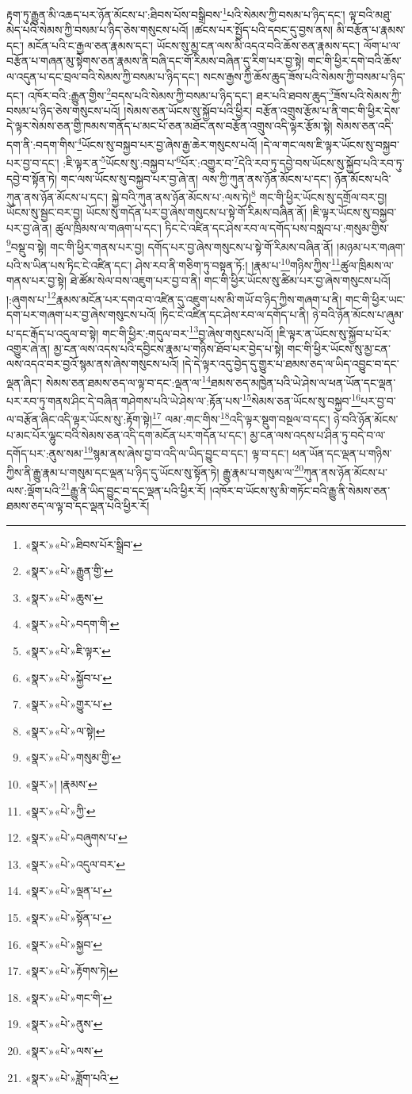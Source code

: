 རྟག་ཏུ་རྒྱུན་མི་འཆད་པར་ཉོན་མོངས་པ་:ཐིབས་པོས་བསྒྲིབས་\footnote{«སྣར་»«པེ་»ཐིབས་པོར་སྒྲིབ་}པའི་སེམས་ཀྱི་བསམ་པ་ཉིད་དང་། ལྟ་བའི་མཐུ་མེད་པའི་སེམས་ཀྱི་བསམ་པ་ཉིད་ཅེས་གསུངས་པའོ། །ཚངས་པར་སྤྱོད་པའི་དབང་དུ་བྱས་ནས། མི་བརྩོན་པ་རྣམས་དང་། མངོན་པའི་ང་རྒྱལ་ཅན་རྣམས་དང་། ཡོངས་སུ་མྱ་ངན་ལས་མི་འདའ་བའི་ཆོས་ཅན་རྣམས་དང་། ལོག་པ་ལ་བརྩོན་པ་གཞན་མུ་སྟེགས་ཅན་རྣམས་ནི་བཞི་དང་གོ་རིམས་བཞིན་དུ་རིག་པར་བྱ་སྟེ། གང་གི་ཕྱིར་དགེ་བའི་ཆོས་ལ་འདུན་པ་དང་བྲལ་བའི་སེམས་ཀྱི་བསམ་པ་ཉིད་དང་། སངས་རྒྱས་ཀྱི་ཆོས་ཆུད་ཟོས་པའི་སེམས་ཀྱི་བསམ་པ་ཉིད་དང་། འཁོར་བའི་:རྒྱུན་གྱིས་\footnote{«སྣར་»«པེ་»རྒྱུན་གྱི་}བདས་པའི་སེམས་ཀྱི་བསམ་པ་ཉིད་དང་། ཐར་པའི་ཐབས་ཆུད་\footnote{«སྣར་»«པེ་»ཆུས་}ཟོས་པའི་སེམས་ཀྱི་བསམ་པ་ཉིད་ཅེས་གསུངས་པའོ། །སེམས་ཅན་ཡོངས་སུ་སྐྱོབ་པའི་ཕྱིར། བརྩོན་འགྲུས་རྩོམ་པ་ནི་གང་གི་ཕྱིར་དེས་དེ་ལྟར་སེམས་ཅན་གྱི་ཁམས་གནོད་པ་མང་པོ་ཅན་མཐོང་ནས་བརྩོན་འགྲུས་འདི་ལྟར་རྩོམ་སྟེ། སེམས་ཅན་འདི་དག་ནི་:བདག་གིས་\footnote{«སྣར་»«པེ་»བདག་གི་}ཡོངས་སུ་བསྐྱབ་པར་བྱ་ཞེས་རྒྱ་ཆེར་གསུངས་པའོ། །དེ་ལ་གང་ལས་ཇི་ལྟར་ཡོངས་སུ་བསྐྱབ་པར་བྱ་བ་དང་། :ཇི་ལྟར་ན་\footnote{«སྣར་»«པེ་»ཇི་ལྟར་}ཡོངས་སུ་:བསྐྱབ་པ་\footnote{«སྣར་»«པེ་»སྐྱོབ་པ་}པོར་:འགྱུར་བ་\footnote{«སྣར་»«པེ་»གྱུར་པ་}དེའི་རབ་ཏུ་དབྱེ་བས་ཡོངས་སུ་སྐྱོབ་པའི་རབ་ཏུ་དབྱེ་བ་སྟོན་ཏེ། གང་ལས་ཡོངས་སུ་བསྐྱབ་པར་བྱ་ཞེ་ན། ལས་ཀྱི་ཀུན་ནས་ཉོན་མོངས་པ་དང་། ཉོན་མོངས་པའི་ཀུན་ནས་ཉོན་མོངས་པ་དང་། སྐྱེ་བའི་ཀུན་ནས་ཉོན་མོངས་པ་:ལས་ཏེ།\footnote{«སྣར་»«པེ་»ལ་སྟེ།} གང་གི་ཕྱིར་ཡོངས་སུ་དགྲོལ་བར་བྱ། ཡོངས་སུ་སྦྱང་བར་བྱ། ཡོངས་སུ་གདོན་པར་བྱ་ཞེས་གསུངས་པ་སྟེ་གོ་རིམས་བཞིན་ནོ། །ཇི་ལྟར་ཡོངས་སུ་བསྐྱབ་པར་བྱ་ཞེ་ན། ཚུལ་ཁྲིམས་ལ་གཞག་པ་དང་། ཏིང་ངེ་འཛིན་དང་ཤེས་རབ་ལ་དགོད་པས་བསླབ་པ་:གསུམ་གྱིས་\footnote{«སྣར་»«པེ་»གསུམ་གྱི་}བསྡུ་བ་སྟེ། གང་གི་ཕྱིར་གནས་པར་བྱ། དགོད་པར་བྱ་ཞེས་གསུངས་པ་སྟེ་གོ་རིམས་བཞིན་ནོ། །མཉམ་པར་གཞག་པའི་ས་ཡིན་པས་ཏིང་ངེ་འཛིན་དང་། ཤེས་རབ་ནི་གཅིག་ཏུ་བསྟན་ཏོ:། །རྣམ་པ་\footnote{«སྣར་»། །རྣམས་}གཉིས་ཀྱིས་\footnote{«སྣར་»«པེ་»ཀྱི་}ཚུལ་ཁྲིམས་ལ་གནས་པར་བྱ་སྟེ། ཐེ་ཚོམ་སེལ་བས་འཇུག་པར་བྱ་བ་ནི། གང་གི་ཕྱིར་ཡོངས་སུ་ཚིམ་པར་བྱ་ཞེས་གསུངས་པའོ། །:ཞུགས་པ་\footnote{«སྣར་»«པེ་»བཞུགས་པ་}རྣམས་མངོན་པར་དགའ་བ་འཛིན་དུ་འཇུག་པས་མི་གཡོ་བ་ཉིད་ཀྱིས་གཞག་པ་ནི། གང་གི་ཕྱིར་ཡང་དག་པར་གཞག་པར་བྱ་ཞེས་གསུངས་པའོ། །ཏིང་ངེ་འཛིན་དང་ཤེས་རབ་ལ་དགོད་པ་ནི། ཉེ་བའི་ཉོན་མོངས་པ་ཞུམ་པ་དང་རྒོད་པ་འདུལ་བ་སྟེ། གང་གི་ཕྱིར་:གདུལ་བར་\footnote{«སྣར་»«པེ་»འདུལ་བར་}བྱ་ཞེས་གསུངས་པའོ། །ཇི་ལྟར་ན་ཡོངས་སུ་སྐྱོབ་པ་པོར་འགྱུར་ཞེ་ན། མྱ་ངན་ལས་འདས་པའི་དབྱིངས་རྣམ་པ་གཉིས་ཐོབ་པར་བྱེད་པ་སྟེ། གང་གི་ཕྱིར་ཡོངས་སུ་མྱ་ངན་ལས་འདའ་བར་བྱའོ་སྙམ་ནས་ཞེས་གསུངས་པའོ། །དེ་དེ་ལྟར་འདུ་བྱེད་དུ་གྱུར་པ་ཐམས་ཅད་ལ་ཡིད་འབྱུང་བ་དང་ལྡན་ཞིང་། སེམས་ཅན་ཐམས་ཅད་ལ་ལྟ་བ་དང་:ལྡན་ལ་\footnote{«སྣར་»«པེ་»ལྡན་པ་}ཐམས་ཅད་མཁྱེན་པའི་ཡེ་ཤེས་ལ་ཕན་ཡོན་དང་ལྡན་པར་རབ་ཏུ་གནས་ཤིང་དེ་བཞིན་གཤེགས་པའི་ཡེ་ཤེས་ལ་:རྟོན་པས་\footnote{«སྣར་»«པེ་»སྟོན་པ་}སེམས་ཅན་ཡོངས་སུ་བསྐྱབ་\footnote{«སྣར་»«པེ་»སྐྱབ་}པར་བྱ་བ་ལ་བརྩོན་ཞིང་འདི་ལྟར་ཡོངས་སུ་:རྟོག་སྟེ།\footnote{«སྣར་»«པེ་»རྟོགས་ཏེ།} ལམ་:གང་གིས་\footnote{«སྣར་»«པེ་»གང་གི་}འདི་ལྟར་སྡུག་བསྔལ་བ་དང་། ཉེ་བའི་ཉོན་མོངས་པ་མང་པོར་ལྷུང་བའི་སེམས་ཅན་འདི་དག་མངོན་པར་གདོན་པ་དང་། མྱ་ངན་ལས་འདས་པ་ཤིན་ཏུ་བདེ་བ་ལ་དགོད་པར་:ནུས་སམ་\footnote{«སྣར་»«པེ་»ནུས་}སྙམ་ནས་ཞེས་བྱ་བ་འདི་ལ་ཡིད་བྱུང་བ་དང་། ལྟ་བ་དང་། ཕན་ཡོན་དང་ལྡན་པ་གཉིས་ཀྱིས་ནི་རྒྱུ་རྣམ་པ་གསུམ་དང་ལྡན་པ་ཉིད་དུ་ཡོངས་སུ་སྟོན་ཏེ། རྒྱུ་རྣམ་པ་གསུམ་ལ་\footnote{«སྣར་»«པེ་»ལས་}ཀུན་ནས་ཉོན་མོངས་པ་ལས་:ལྡོག་པའི་\footnote{«སྣར་»«པེ་»ཟློག་པའི་}རྒྱུ་ནི་ཡིད་བྱུང་བ་དང་ལྡན་པའི་ཕྱིར་རོ། །འཁོར་བ་ཡོངས་སུ་མི་གཏོང་བའི་རྒྱུ་ནི་སེམས་ཅན་ཐམས་ཅད་ལ་ལྟ་བ་དང་ལྡན་པའི་ཕྱིར་རོ། 